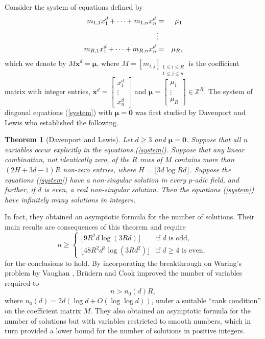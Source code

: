 \documentclass[reqno, 12pt, reqno]{amsart}
\numberwithin{equation}{section}
\newtheorem{theorem}{Theorem}[section]
\newcommand{\ZZ}{\mathbb{Z}}
\renewcommand{\leq}{\leqslant}
\renewcommand{\geq}{\geqslant}
\newcommand{\x}{\mathbf{x}}
\renewcommand{\=}{\equiv}
\begin{document}
Consider the system of equations defined by
\begin{eqnarray}\label{eq:msos}
m_{1,1} x_{1}^d + \cdots + m_{1,n} x_n^d &=& \mu_1 \label{system} \\
                               &\vdots& \notag \\
m_{R, 1}  x_{1}^d + \cdots + m_{R, n} x_n^d &=& \mu_R, \notag
\end{eqnarray}
which we denote by $M \x^d = \boldsymbol{\mu}$,
where $M = [m_{i, j}]_{ \substack{ 1 \leq i \leq R \\ 1 \leq j \leq n } }$ is the coefficient matrix with integer entries,
$\x^d = \begin{bmatrix}
          x_1^d \\
          \vdots  \\
          x_n^d
        \end{bmatrix}$
and
$\boldsymbol{\mu} = \begin{bmatrix}
          \mu_1 \\
          \vdots  \\
          \mu_R
        \end{bmatrix} \in \ZZ^R.$
The system of diagonal equations (\ref{system}) with $\boldsymbol{\mu} = \mathbf{0}$ was first studied by Davenport and Lewis \cite[Lemma 32]{DavenportLewis}
who established the following.
\begin{theorem}[Davenport and Lewis]
Let $d \geq 3$ and $\boldsymbol{\mu} = \mathbf{0}$. Suppose that all $n$ variables occur explicitly in the equations (\ref{system}). Suppose that any linear combination, not identically zero, of
the $R$ rows of $M$ contains more than $(2 H + 3d - 1)R$ non-zero entries, where $H = \lfloor 3 d \log R d\rfloor$. Suppose the equations (\ref{system}) have a non-singular solution in every $p$-adic field, and further, if $d$ is even, a real non-singular solution. Then the equations (\ref{system}) have infinitely many solutions in integers.
\end{theorem}
In fact, they obtained an asymptotic formula for the number of solutions.
Their main results \cite[Theorems 1 and 2]{DavenportLewis} are consequences of this theorem and require
$$
n \geq \begin{cases} \lfloor 9 R^2 d \log (3 R d) \rfloor & \mbox{if $d$ is odd}, \\
\lfloor 48 R^2 d^3 \log (3 R d^2) \rfloor & \mbox{if $d \geq 4$ is even},
\end{cases}
$$
for the conclusions to hold. By incorporating the breakthrough on Waring's problem by Vaughan \cite{Va89}, Br\"{u}dern and Cook \cite{BC}
improved the number of variables required to
$$
n > n_0(d) R,
$$
where $n_0(d) = 2 d (\log  d + O(\log \log d) )$, under a suitable ``rank condition'' on the coefficient matrix $M$.
They also obtained an asymptotic formula for the number of solutions but with variables restricted to smooth numbers, which  in turn provided a lower bound for the number of solutions in positive integers.
\end{document}
